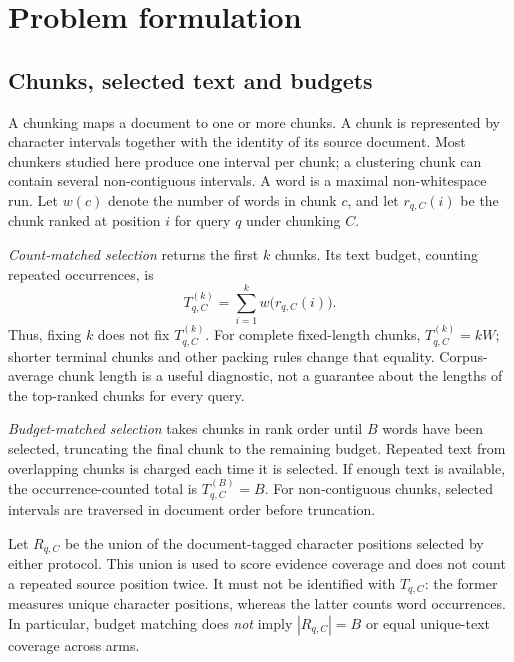 \documentclass[11pt]{article}
\begin{document}
\section{Problem formulation}\label{sec:problem}
\subsection{Chunks, selected text and budgets}
A chunking maps a document to one or more chunks. A chunk is represented by character intervals together with the
identity of its source document. Most chunkers studied here produce one interval per chunk; a clustering chunk can
contain several non-contiguous intervals. A word is a maximal non-whitespace run. Let $w(c)$ denote the number of
words in chunk $c$, and let $r_{q,C}(i)$ be the chunk ranked at position $i$ for query $q$ under chunking $C$.

\emph{Count-matched selection} returns the first $k$ chunks. Its text budget, counting repeated occurrences, is
\begin{equation}
 T^{(k)}_{q,C}=\sum_{i=1}^{k} w\bigl(r_{q,C}(i)\bigr).
 \label{eq:countbudget}
\end{equation}
Thus, fixing $k$ does not fix $T^{(k)}_{q,C}$. For complete fixed-length chunks, $T^{(k)}_{q,C}=kW$; shorter terminal
chunks and other packing rules change that equality. Corpus-average chunk length is a useful diagnostic, not a
guarantee about the lengths of the top-ranked chunks for every query.

\emph{Budget-matched selection} takes chunks in rank order until $B$ words have been selected, truncating the final
chunk to the remaining budget. Repeated text from overlapping chunks is charged each time it is selected. If enough
text is available, the occurrence-counted total is $T^{(B)}_{q,C}=B$. For non-contiguous chunks, selected intervals
are traversed in document order before truncation.

Let $R_{q,C}$ be the union of the document-tagged character positions selected by either protocol. This union is used
to score evidence coverage and does not count a repeated source position twice. It must not be identified with
$T_{q,C}$: the former measures unique character positions, whereas the latter counts word occurrences. In particular,
budget matching does \emph{not} imply $|R_{q,C}|=B$ or equal unique-text coverage across arms.
\end{document}
